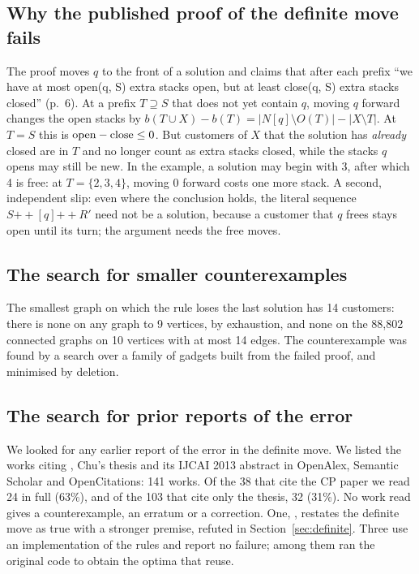 \subsection{Why the published proof of the definite move fails}
\label{app:whyfails}

The proof moves $q$ to the front of a
solution and claims that after each prefix ``we have at most open(q, S) extra
stacks open, but at least close(q, S) extra stacks closed'' (p.~6). At a prefix
$T\supseteq S$ that does not yet contain $q$, moving $q$ forward changes the open
stacks by $b(T\cup X)-b(T) = |N[q]\setminus O(T)|-|X\setminus T|$. At $T=S$ this
is $\mathrm{open}-\mathrm{close}\le0$. But customers of $X$ that the solution has \emph{already}
closed are in $T$ and no longer count as extra stacks closed, while the stacks
$q$ opens may still be new. In the example, a solution may begin with 3, after
which 4 is free: at $T=\{2,3,4\}$, moving 0 forward costs one more stack. A
second, independent slip: even where the conclusion holds, the literal sequence
$S \mathbin{+\!\!+} [q] \mathbin{+\!\!+} R'$ need not be a solution, because a
customer that $q$ frees stays open until its turn; the argument needs the free
moves.

\subsection{The search for smaller counterexamples}
\label{app:minimality}

The smallest graph on which the rule loses the last solution has 14 customers:
there is none on any graph to 9 vertices, by exhaustion, and none on the 88,802
connected graphs on 10 vertices with at most 14 edges. The counterexample was
found by a search over a family of gadgets built from the failed proof, and
minimised by deletion.

\subsection{The search for prior reports of the error}
\label{app:prior}

We looked for any earlier report of the error in the definite move. We
listed the works citing \citet{ChuStuckey2009}, Chu's thesis and its IJCAI 2013
abstract in OpenAlex, Semantic Scholar and OpenCitations: 141 works. Of the 38
that cite the CP paper we read 24 in full (63\%), and of the 103 that cite only
the thesis, 32 (31\%). No work read gives a counterexample, an erratum or a
correction. One, \citet{Fink2012}, restates the definite move as true with a
stronger premise, refuted in Section~\ref{sec:definite}. Three use an
implementation of the rules and report no failure; among them
\citet{Frinhani2018} ran the original code to obtain the optima that
\citet{MartinYanassePinto2022} reuse.

